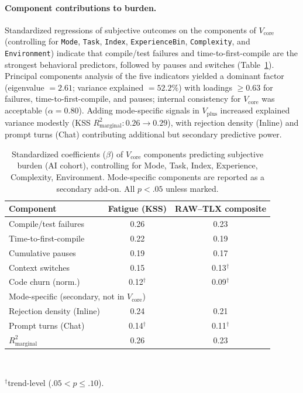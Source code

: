 \documentclass[sigconf]{acmart}
\begin{document}
\paragraph{Component contributions to burden.}
Standardized regressions of subjective outcomes on the components of $V_{\text{core}}$ (controlling for \texttt{Mode}, \texttt{Task}, \texttt{Index}, \texttt{ExperienceBin}, \texttt{Complexity}, and \texttt{Environment}) indicate that compile/test failures and time-to-first-compile are the strongest behavioral predictors, followed by pauses and switches (Table~\ref{tab:vcore-betas}). Principal components analysis of the five indicators yielded a dominant factor (eigenvalue $=2.61$; variance explained $=52.2\%$) with loadings $\geq 0.63$ for failures, time-to-first-compile, and pauses; internal consistency for $V_{\text{core}}$ was acceptable ($\alpha{=}0.80$). Adding mode-specific signals in $V_{\text{plus}}$ increased explained variance modestly (KSS $R^2_{\text{marginal}}: 0.26 \rightarrow 0.29$), with rejection density (Inline) and prompt turns (Chat) contributing additional but secondary predictive power.

\begin{table}[t]
  \centering
  \caption{Standardized coefficients ($\beta$) of $V_{\text{core}}$ components predicting subjective burden (AI cohort), controlling for Mode, Task, Index, Experience, Complexity, Environment. Mode-specific components are reported as a secondary add-on. All $p{<}.05$ unless marked.}
  \label{tab:vcore-betas}
  \small
  \begin{tabular}{lcc}
    \toprule
    \textbf{Component} & \textbf{Fatigue (KSS)} & \textbf{RAW--TLX composite} \\
    \midrule
    Compile/test failures & 0.26 & 0.23 \\
    Time-to-first-compile & 0.22 & 0.19 \\
    Cumulative pauses & 0.19 & 0.17 \\
    Context switches & 0.15 & 0.13$^{\dagger}$ \\
    Code churn (norm.) & 0.12$^{\dagger}$ & 0.09$^{\dagger}$ \\
    \midrule
    \multicolumn{3}{l}{Mode-specific (secondary, not in $V_{\text{core}}$)} \\
    Rejection density (Inline) & 0.24 & 0.21 \\
    Prompt turns (Chat) & 0.14$^{\dagger}$ & 0.11$^{\dagger}$ \\
    \midrule
    $R^2_{\text{marginal}}$ & 0.26 & 0.23 \\
    \bottomrule
  \end{tabular}\\
  \vspace{0.25em}
  \raggedright \footnotesize $^{\dagger}$trend-level ($.05{<}p{\le}.10$).
\end{table}
\end{document}
